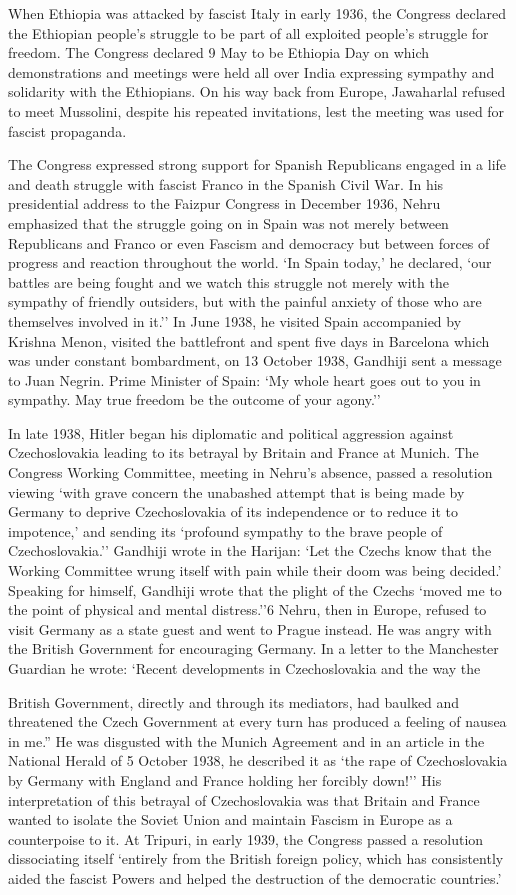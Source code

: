 When Ethiopia was attacked by fascist Italy in early 1936, the Congress declared the Ethiopian people's struggle to be part of all exploited people's struggle for freedom. The Congress declared 9 May to be Ethiopia Day on which demonstrations and meetings were held all over India expressing sympathy and solidarity with the Ethiopians. On his way back from Europe, Jawaharlal refused to meet Mussolini, despite his repeated invitations, lest the meeting was used for fascist propaganda. 

The Congress expressed strong support for Spanish Republicans engaged in a life and death struggle with fascist Franco in the Spanish Civil War. In his presidential address to the Faizpur Congress in December 1936, Nehru emphasized that the struggle going on in Spain was not merely between Republicans and Franco or even Fascism and democracy but between forces of progress and reaction throughout the world. `In Spain today,' he declared, `our battles are being fought and we watch this struggle not merely with the sympathy of friendly outsiders, but with the painful anxiety of those who are themselves involved in it.'' In June 1938, he visited Spain accompanied by Krishna Menon, visited the battlefront and spent five days in Barcelona which was under constant bombardment, on 13 October 1938, Gandhiji sent a message to Juan Negrin. Prime Minister of Spain: `My whole heart goes out to you in sympathy. May true freedom be the outcome of your agony.'' 

In late 1938, Hitler began his diplomatic and political aggression against Czechoslovakia leading to its betrayal by Britain and France at Munich. The Congress Working Committee, meeting in Nehru's absence, passed a resolution viewing `with grave concern the unabashed attempt that is being made by Germany to deprive Czechoslovakia of its independence or to reduce it to impotence,' and sending its `profound sympathy to the brave people of Czechoslovakia.'' Gandhiji wrote in the Harijan: `Let the Czechs know that the Working Committee wrung itself with pain while their doom was being decided.' Speaking for himself, Gandhiji wrote that the plight of the Czechs `moved me to the point of physical and mental distress.''6 Nehru, then in Europe, refused to visit Germany as a state guest and went to Prague instead. He was angry with the British Government for encouraging Germany. In a letter to the Manchester Guardian he wrote: `Recent developments in Czechoslovakia and the way the 

British Government, directly and through its mediators, had baulked and threatened the Czech Government at every turn has produced a feeling of nausea in me.'' He was disgusted with the Munich Agreement and in an article in the National Herald of 5 October 1938, he described it as `the rape of Czechoslovakia by Germany with England and France holding her forcibly down!'' His interpretation of this betrayal of Czechoslovakia was that Britain and France wanted to isolate the Soviet Union and maintain Fascism in Europe as a counterpoise to it. At Tripuri, in early 1939, the Congress passed a resolution dissociating itself `entirely from the British foreign policy, which has consistently aided the fascist Powers and helped the destruction of the democratic countries.' 

